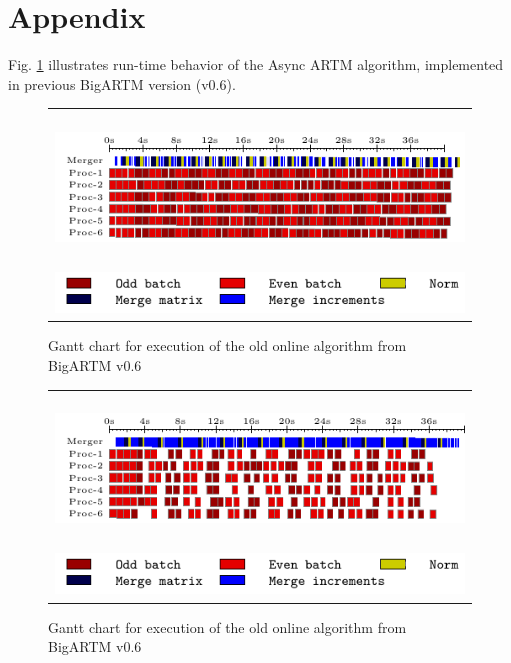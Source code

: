 \documentclass[russian,english]{llncs}
\newcommand{\kw}[1]{\textsf{#1}}
\begin{document}
\newpage
\section*{Appendix}
\label{sec:Appendix}

Fig. \ref{fig:gantt:AsyncARTM} illustrates run-time behavior of the \kw{Async ARTM} algorithm, implemented in previous BigARTM version (\kw{v0.6}).

\begin{figure}[h]
	\centering
	\begin{tabular}{c}
		\includegraphics[height=4cm, width=12cm]{plots/old.pdf} \\
		\includegraphics[scale=1]{plots/legend_old.pdf}
	\end{tabular}
	\caption{Gantt chart for execution of the old online algorithm from BigARTM \kw{v0.6}} \label{fig:gantt:AsyncARTM}
\end{figure}

\begin{figure}[h]
	\centering
	\begin{tabular}{c}
		\includegraphics[height=4cm, width=12cm]{plots/old_slow.pdf} \\
		\includegraphics[scale=1]{plots/legend_old.pdf}
	\end{tabular}
	\caption{Gantt chart for execution of the old online algorithm from BigARTM \kw{v0.6}} \label{fig:gantt:AsyncARTM:slow}
\end{figure}
\end{document}
